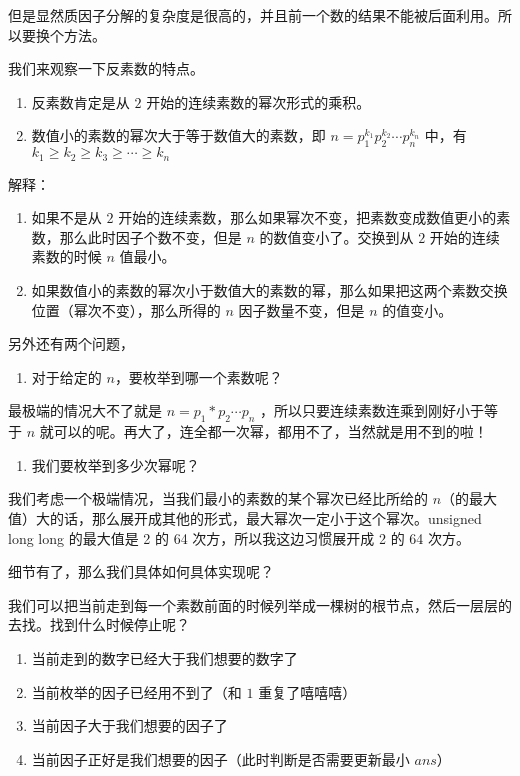 但是显然质因子分解的复杂度是很高的，并且前一个数的结果不能被后面利用。所以要换个方法。

我们来观察一下反素数的特点。

\begin{enumerate}
\item 反素数肯定是从 $2$ 开始的连续素数的幂次形式的乘积。
\item 数值小的素数的幂次大于等于数值大的素数，即 $n=p_{1}^{k_{1}}p_{2}^{k_{2}} \cdots p_{n}^{k_{n}}$ 中，有 $k_1 \geq k_2 \geq k_3 \geq \cdots \geq k_n$
\end{enumerate}

解释：

\begin{enumerate}
\item 如果不是从 $2$ 开始的连续素数，那么如果幂次不变，把素数变成数值更小的素数，那么此时因子个数不变，但是 $n$ 的数值变小了。交换到从 $2$ 开始的连续素数的时候 $n$ 值最小。
\item 如果数值小的素数的幂次小于数值大的素数的幂，那么如果把这两个素数交换位置（幂次不变），那么所得的 $n$ 因子数量不变，但是 $n$ 的值变小。
\end{enumerate}

另外还有两个问题，

\begin{enumerate}
\item 对于给定的 $n$，要枚举到哪一个素数呢？
\end{enumerate}

最极端的情况大不了就是 $n=p_{1}*p_{2} \cdots p_{n}$ ，所以只要连续素数连乘到刚好小于等于 $n$ 就可以的呢。再大了，连全都一次幂，都用不了，当然就是用不到的啦！

\begin{enumerate}
\item 我们要枚举到多少次幂呢？
\end{enumerate}

我们考虑一个极端情况，当我们最小的素数的某个幂次已经比所给的 $n$（的最大值）大的话，那么展开成其他的形式，最大幂次一定小于这个幂次。unsigned long long 的最大值是 2 的 64 次方，所以我这边习惯展开成 2 的 64 次方。

细节有了，那么我们具体如何具体实现呢？

我们可以把当前走到每一个素数前面的时候列举成一棵树的根节点，然后一层层的去找。找到什么时候停止呢？

\begin{enumerate}
\item 当前走到的数字已经大于我们想要的数字了
\item 当前枚举的因子已经用不到了（和 $1$ 重复了嘻嘻嘻）
\item 当前因子大于我们想要的因子了
\item 当前因子正好是我们想要的因子（此时判断是否需要更新最小 $ans$）
\end{enumerate}

